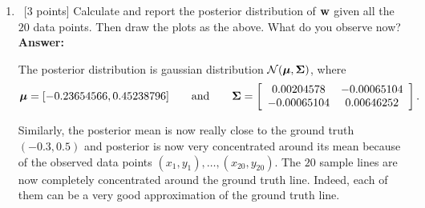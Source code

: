 \documentclass[12pt, fullpage,letterpaper]{article}
\def\red{\color{red}}
\def\blackblue{\color{black!40!blue}}
\begin{document}
\begin{enumerate}
\begin{enumerate}
{		
	}
		\item~[3 points] Calculate and report the posterior distribution of ${\bf w}$ given all the $20$ data points. Then draw the plots as the above. What do you observe now?  \\
	{\bf \red Answer:} {\blackblue 
	The posterior distribution is gaussian distribution $\mathcal{N}(\boldsymbol{\mu}, \boldsymbol{\Sigma})$, where 
	$$\boldsymbol{\mu} =  [-0.23654566, 0.45238796]\quad\quad\text{and}\quad \quad \boldsymbol{\Sigma} = \left[\begin{array}{cc}0.00204578 &  -0.00065104\\
	-0.00065104 & 0.00646252
	\end{array}\right].$$
	
	Similarly, the posterior mean is now really close to the ground truth $(-0.3,0.5)$ and posterior is now very concentrated around its mean because of the observed data points $(x_1,y_1),\ldots, (x_{20},y_{20})$. The $20$ sample lines are now completely concentrated around the ground truth line. Indeed, each of them can be a very good approximation of the ground truth line. 
		
}
\end{enumerate}
\end{enumerate}
\end{document}
